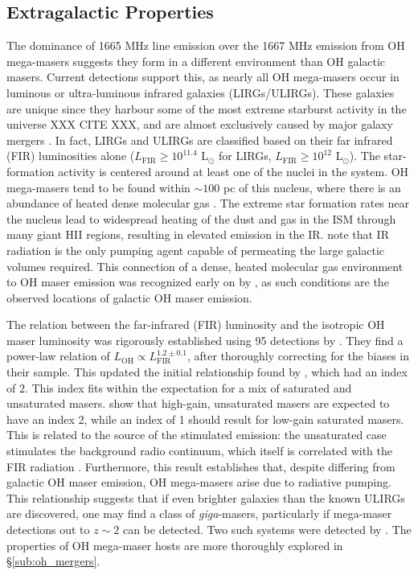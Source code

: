 \subsection{Extragalactic Properties}
\label{sub:oh_gal_props}

The dominance of 1665 MHz line emission over the 1667 MHz emission from OH mega-masers suggests they form in a different environment than OH galactic masers. Current detections support this, as nearly all OH mega-masers occur in luminous or ultra-luminous infrared galaxies (LIRGs/ULIRGs). These galaxies are unique since they harbour some of the most extreme starburst activity in the universe XXX CITE XXX, and are almost exclusively caused by major galaxy mergers \citep{clements1996}. In fact, LIRGs and ULIRGs are classified based on their far infrared (FIR) luminosities alone ($L_{\mathrm{FIR}} \ge 10^{11.4}$ L$_{\odot}$ for LIRGs, $L_{\mathrm{FIR}} \ge 10^{12}$ L$_{\odot}$).  The star-formation activity is centered around at least one of the nuclei in the system. OH mega-masers tend to be found within $\sim 100$ pc of this nucleus, where there is an abundance of heated dense molecular gas \citep{lo2005}. The extreme star formation rates near the nucleus lead to widespread heating of the dust and gas in the ISM through many giant HII regions, resulting in elevated emission in the IR. \citet{Elitzur_1992} note that IR radiation is the only pumping agent capable of permeating the large galactic volumes required. This connection of a dense, heated molecular gas environment to OH maser emission was recognized early on by \citet{Bottinelli_1987}, as such conditions are the observed locations of galactic OH maser emission. 

The relation between the far-infrared (FIR) luminosity and the isotropic OH maser luminosity was rigorously established using 95 detections by \citet{darling2002_paperIII}. They find a power-law relation of $L_{\mathrm{OH}} \propto L_{\mathrm{FIR}}^{1.2\pm0.1}$, after thoroughly correcting for the biases in their sample. This updated the initial relationship found by \cite{Baan_1989}, which had an index of 2.  This index fits within the expectation for a mix of saturated and unsaturated masers. \citet{darling2002_paperIII} show that high-gain, unsaturated masers are expected to have an index 2, while an index of 1 should result for low-gain saturated masers. This is related to the source of the stimulated emission: the unsaturated case stimulates the background radio continuum, which itself is correlated with the FIR radiation \citep{Yun_2001}. Furthermore, this result establishes that, despite differing from galactic OH maser emission, OH mega-masers arise due to radiative pumping. This relationship suggests that if even brighter galaxies than the known ULIRGs are discovered, one may find a class of {\it giga}-masers, particularly if mega-maser detections out to $z\sim 2$ can be detected.  Two such systems were detected by \citet{darling2002_paperIII}.  The properties of OH mega-maser hosts are more thoroughly explored in \S\ref{sub:oh_mergers}.

